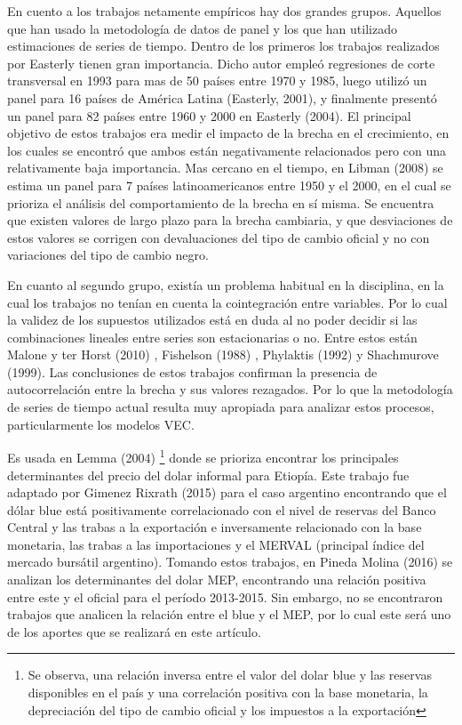 \documentclass[11pt,a4paper]{article}
\begin{document}
En cuento a los trabajos netamente empíricos hay dos grandes grupos. Aquellos que han usado la metodología de datos de panel y los que han utilizado estimaciones de series de tiempo. Dentro de los primeros los trabajos realizados por Easterly tienen gran importancia. Dicho autor empleó regresiones de corte transversal en 1993 para mas de 50 países entre 1970 y 1985, luego utilizó un panel para 16 países de América Latina (Easterly, 2001), y finalmente presentó un panel para 82 países entre 1960 y 2000 en Easterly (2004). El principal objetivo de estos trabajos era medir el impacto de la brecha en el crecimiento, en los cuales se encontró que ambos están negativamente relacionados pero con una relativamente baja importancia. Mas cercano en el tiempo, en Libman (2008) se estima un panel para 7 países latinoamericanos entre 1950 y el 2000, en el cual se prioriza el análisis del comportamiento de la brecha en sí misma. Se encuentra que existen valores de largo plazo para la brecha cambiaria, y que desviaciones de estos valores se corrigen con devaluaciones del tipo de cambio oficial y no con variaciones del tipo de cambio negro.

En cuanto al segundo grupo, existía un problema habitual en la disciplina, en la cual los trabajos no tenían en cuenta la cointegración entre variables. Por lo cual la validez de los supuestos utilizados está en duda al no poder decidir si las combinaciones lineales entre series son estacionarias o no. Entre estos están Malone y ter Horst (2010) , Fishelson (1988) , Phylaktis (1992) y Shachmurove (1999). Las conclusiones de estos trabajos confirman la presencia de autocorrelación entre la brecha y sus valores rezagados. Por lo que la metodología de series de tiempo actual resulta muy apropiada para analizar estos procesos, particularmente los modelos VEC.

Es usada en Lemma (2004) \footnote{Se observa, una relación inversa entre el valor del dolar blue y las reservas disponibles en el país y una correlación positiva con la base monetaria, la depreciación del tipo de cambio oficial y los impuestos a la exportación} donde se prioriza encontrar los principales determinantes del precio del dolar informal para Etiopía. Este trabajo fue adaptado por Gimenez Rixrath (2015) para el caso argentino encontrando que el dólar blue está positivamente correlacionado con el nivel de reservas del Banco Central y las trabas a la exportación e inversamente relacionado con la base monetaria, las trabas a las importaciones y el MERVAL (principal índice del mercado bursátil argentino). Tomando estos trabajos, en Pineda Molina (2016) se analizan los determinantes del dolar MEP, encontrando una relación positiva entre este y el oficial para el período 2013-2015. Sin embargo, no se encontraron trabajos que analicen la relación entre el blue y el MEP, por lo cual este será uno de los aportes que se realizará en este artículo. 
\end{document}
